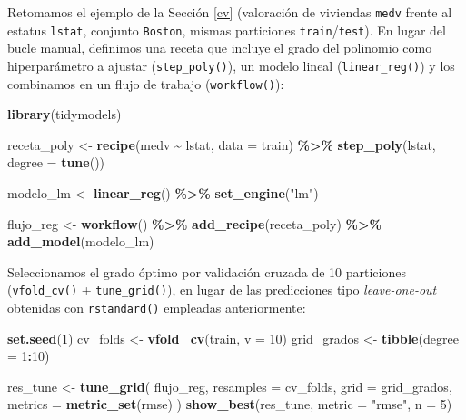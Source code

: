 \documentclass[
]{book}
\newenvironment{Shaded}{\begin{snugshade}}{\end{snugshade}}
\newcommand{\AttributeTok}[1]{\textcolor[rgb]{0.13,0.29,0.53}{#1}}
\newcommand{\DecValTok}[1]{\textcolor[rgb]{0.00,0.00,0.81}{#1}}
\newcommand{\FunctionTok}[1]{\textcolor[rgb]{0.13,0.29,0.53}{\textbf{#1}}}
\newcommand{\NormalTok}[1]{#1}
\newcommand{\OtherTok}[1]{\textcolor[rgb]{0.56,0.35,0.01}{#1}}
\newcommand{\SpecialCharTok}[1]{\textcolor[rgb]{0.81,0.36,0.00}{\textbf{#1}}}
\newcommand{\StringTok}[1]{\textcolor[rgb]{0.31,0.60,0.02}{#1}}
\theoremstyle{break}
\theoremstyle{nonumberplain}
\begin{document}
Retomamos el ejemplo de la Sección \ref{cv} (valoración de viviendas \texttt{medv} frente al estatus \texttt{lstat}, conjunto \texttt{Boston}, mismas particiones \texttt{train}/\texttt{test}). En lugar del bucle manual, definimos una receta que incluye el grado del polinomio como hiperparámetro a ajustar (\texttt{step\_poly()}), un modelo lineal (\texttt{linear\_reg()}) y los combinamos en un flujo de trabajo (\texttt{workflow()}):

\begin{Shaded}
\begin{Highlighting}[]
\FunctionTok{library}\NormalTok{(tidymodels)}

\NormalTok{receta\_poly }\OtherTok{\textless{}{-}} \FunctionTok{recipe}\NormalTok{(medv }\SpecialCharTok{\textasciitilde{}}\NormalTok{ lstat, }\AttributeTok{data =}\NormalTok{ train) }\SpecialCharTok{\%\textgreater{}\%}
  \FunctionTok{step\_poly}\NormalTok{(lstat, }\AttributeTok{degree =} \FunctionTok{tune}\NormalTok{())}

\NormalTok{modelo\_lm }\OtherTok{\textless{}{-}} \FunctionTok{linear\_reg}\NormalTok{() }\SpecialCharTok{\%\textgreater{}\%}
  \FunctionTok{set\_engine}\NormalTok{(}\StringTok{"lm"}\NormalTok{)}

\NormalTok{flujo\_reg }\OtherTok{\textless{}{-}} \FunctionTok{workflow}\NormalTok{() }\SpecialCharTok{\%\textgreater{}\%}
  \FunctionTok{add\_recipe}\NormalTok{(receta\_poly) }\SpecialCharTok{\%\textgreater{}\%}
  \FunctionTok{add\_model}\NormalTok{(modelo\_lm)}
\end{Highlighting}
\end{Shaded}

Seleccionamos el grado óptimo por validación cruzada de 10 particiones (\texttt{vfold\_cv()} + \texttt{tune\_grid()}), en lugar de las predicciones tipo \emph{leave-one-out} obtenidas con \texttt{rstandard()} empleadas anteriormente:

\begin{Shaded}
\begin{Highlighting}[]
\FunctionTok{set.seed}\NormalTok{(}\DecValTok{1}\NormalTok{)}
\NormalTok{cv\_folds }\OtherTok{\textless{}{-}} \FunctionTok{vfold\_cv}\NormalTok{(train, }\AttributeTok{v =} \DecValTok{10}\NormalTok{)}
\NormalTok{grid\_grados }\OtherTok{\textless{}{-}} \FunctionTok{tibble}\NormalTok{(}\AttributeTok{degree =} \DecValTok{1}\SpecialCharTok{:}\DecValTok{10}\NormalTok{)}

\NormalTok{res\_tune }\OtherTok{\textless{}{-}} \FunctionTok{tune\_grid}\NormalTok{(}
\NormalTok{  flujo\_reg,}
  \AttributeTok{resamples =}\NormalTok{ cv\_folds,}
  \AttributeTok{grid =}\NormalTok{ grid\_grados,}
  \AttributeTok{metrics =} \FunctionTok{metric\_set}\NormalTok{(rmse)}
\NormalTok{)}
\FunctionTok{show\_best}\NormalTok{(res\_tune, }\AttributeTok{metric =} \StringTok{"rmse"}\NormalTok{, }\AttributeTok{n =} \DecValTok{5}\NormalTok{)}
\end{Highlighting}
\end{Shaded}
\end{document}
